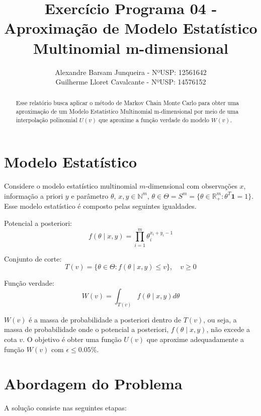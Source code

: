 \documentclass{article}
\title{Exercício Programa 04 - Aproximação de Modelo Estatístico Multinomial m-dimensional}
\author{Alexandre Barsam Junqueira - NºUSP: 12561642\\Guilherme Lloret Cavalcante - NºUSP: 14576152}
\begin{document}
\maketitle

\begin{abstract}
Esse relatório busca aplicar o método de Markov Chain Monte Carlo para obter uma aproximação de um Modelo Estatístico Multinomial m-dimensional por meio de uma interpolação polinomial $U(v)$ que aproxime a função verdade do modelo $W(v)$.

\end{abstract}

\section{Modelo Estatístico}
Considere o modelo estatístico multinomial $m$-dimensional com observações $x$, informação a priori $y$ e parâmetro $\theta$, $x,y \in \mathbb{N}^m$, $\theta \in \Theta = S^m = \{\theta \in \mathbb{R}^m_+ : \theta^T \mathbf{1} = 1\}$. Esse modelo estatístico é composto pelas seguintes igualdades.

Potencial a posteriori:
\[ f(\theta \mid x,y) = \prod_{i=1}^{m} \theta^{x_i + y_i - 1}_i \]

Conjunto de corte:
\[ T(v) = \{\theta \in \Theta : f(\theta \mid x,y) \leq v\}, \quad v \geq 0 \]

Função verdade:
\[ W(v) = \int_{T(v)} f(\theta \mid x,y) d\theta \]

$W(v)$ é a massa de probabilidade a posteriori dentro de $T(v)$, ou seja, a massa de probabilidade onde o potencial a posteriori, $f(\theta \mid x,y)$, não excede a cota $v$. O objetivo é obter uma função $U(v)$ que aproxime adequadamente a função $W(v)$ com $\epsilon \leq 0.05\%$.

\section{Abordagem do Problema}
A solução consiste nas seguintes etapas:
\end{document}

